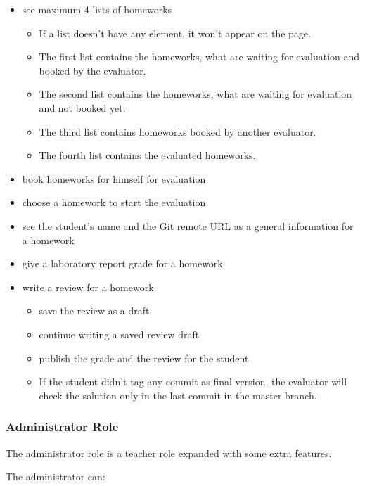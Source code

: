 \begin{itemize}
	\item see maximum 4 lists of homeworks
	\begin{itemize}
		\item If a list doesn't have any element, it won't appear on the page.
		\item The first list contains the homeworks, what are waiting for evaluation and booked by the evaluator. 
		\item The second list contains the homeworks, what are waiting for evaluation and not booked yet. 
		\item The third list contains homeworks booked by another evaluator. 
		\item The fourth list contains the evaluated homeworks. 
	\end{itemize}
	\item book homeworks for himself for evaluation
	\item choose a homework to start the evaluation
	\item see the student's name and the Git remote URL as a general information for a homework
	\item give a laboratory report grade for a homework
	\item write a review for a homework
		\begin{itemize}
			\item save the review as a draft
			\item continue writing a saved review draft
			\item publish the grade and the review for the student
			\item If the student didn't tag any commit as final version, the evaluator will check the solution only in the last commit in the master branch.
		\end{itemize}
\end{itemize}

\subsubsection{Administrator Role}

The administrator role is a teacher role expanded with some extra features.

The administrator can:


